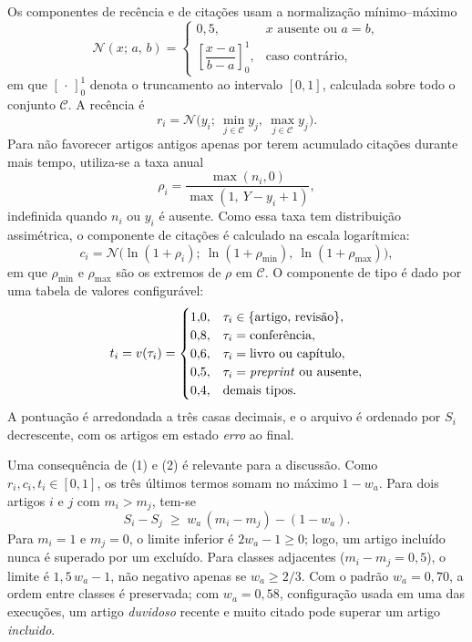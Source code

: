 \documentclass[10pt,a4paper,twocolumn]{article}
\newcommand{\cod}[1]{\textit{#1}}
\begin{document}
Os componentes de recência e de citações usam a normalização mínimo--máximo
\begin{equation}
  \mathcal{N}(x;\,a,\,b) =
  \begin{cases}
    0{,}5, & x \text{ ausente ou } a = b,\\[2pt]
    \left[\dfrac{x - a}{b - a}\right]_{0}^{1}, & \text{caso contrário},
  \end{cases}
\end{equation}
em que $[\,\cdot\,]_0^1$ denota o truncamento ao intervalo $[0,1]$, calculada sobre todo o conjunto $\mathcal{C}$. A recência é
\begin{equation}
  r_i = \mathcal{N}\big(y_i;\ \min_{j \in \mathcal{C}} y_j,\ \max_{j \in \mathcal{C}} y_j\big).
\end{equation}
Para não favorecer artigos antigos apenas por terem acumulado citações durante mais tempo, utiliza-se a taxa anual
\begin{equation}
  \rho_i = \frac{\max(n_i, 0)}{\max(1,\ Y - y_i + 1)} ,
\end{equation}
indefinida quando $n_i$ ou $y_i$ é ausente. Como essa taxa tem distribuição assimétrica, o componente de citações é calculado na escala logarítmica:
\begin{equation}
  c_i = \mathcal{N}\big(\ln(1 + \rho_i);\ \ln(1 + \rho_{\min}),\ \ln(1 + \rho_{\max})\big),
\end{equation}
em que $\rho_{\min}$ e $\rho_{\max}$ são os extremos de $\rho$ em $\mathcal{C}$. O componente de tipo é dado por uma tabela de valores configurável:
\begin{equation}
  t_i = v(\tau_i) =
  \begin{cases}
    1{,}0, & \tau_i \in \{\text{artigo, revisão}\},\\
    0{,}8, & \tau_i = \text{conferência},\\
    0{,}6, & \tau_i = \text{livro ou capítulo},\\
    0{,}5, & \tau_i = \text{\emph{preprint}} \text{ ou ausente},\\
    0{,}4, & \text{demais tipos}.
  \end{cases}
\end{equation}
A pontuação é arredondada a três casas decimais, e o arquivo é ordenado por $S_i$ decrescente, com os artigos em estado \cod{erro} ao final.

Uma consequência de (1) e (2) é relevante para a discussão. Como $r_i, c_i, t_i \in [0,1]$, os três últimos termos somam no máximo $1 - w_a$. Para dois artigos $i$ e $j$ com $m_i > m_j$, tem-se
\begin{equation}
  S_i - S_j \;\ge\; w_a\,(m_i - m_j) - (1 - w_a).
\end{equation}
Para $m_i = 1$ e $m_j = 0$, o limite inferior é $2w_a - 1 \ge 0$; logo, um artigo incluído nunca é superado por um excluído. Para classes adjacentes ($m_i - m_j = 0{,}5$), o limite é $1{,}5\,w_a - 1$, não negativo apenas se $w_a \ge 2/3$. Com o padrão $w_a = 0{,}70$, a ordem entre classes é preservada; com $w_a = 0{,}58$, configuração usada em uma das execuções, um artigo \cod{duvidoso} recente e muito citado pode superar um artigo \cod{incluido}.
\end{document}
